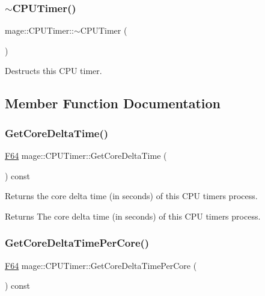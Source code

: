 \subsubsection{\texorpdfstring{$\sim$\+C\+P\+U\+Timer()}{~CPUTimer()}}
{\footnotesize\ttfamily mage\+::\+C\+P\+U\+Timer\+::$\sim$\+C\+P\+U\+Timer (\begin{DoxyParamCaption}{ }\end{DoxyParamCaption})\hspace{0.3cm}{\ttfamily [default]}}

Destructs this C\+PU timer. 

\subsection{Member Function Documentation}
\hypertarget{classmage_1_1_c_p_u_timer_a5d033c20772755d6a6693e1b495cf589}{}\label{classmage_1_1_c_p_u_timer_a5d033c20772755d6a6693e1b495cf589} 
\subsubsection{\texorpdfstring{Get\+Core\+Delta\+Time()}{GetCoreDeltaTime()}}
{\footnotesize\ttfamily \hyperlink{namespacemage_ad26233bbec640deda836e572c1a23708}{F64} mage\+::\+C\+P\+U\+Timer\+::\+Get\+Core\+Delta\+Time (\begin{DoxyParamCaption}{ }\end{DoxyParamCaption}) const\hspace{0.3cm}{\ttfamily [noexcept]}}

Returns the core delta time (in seconds) of this C\+PU timer\textquotesingle{}s process.

\begin{DoxyReturn}{Returns}
The core delta time (in seconds) of this C\+PU timer\textquotesingle{}s process. 
\end{DoxyReturn}
\hypertarget{classmage_1_1_c_p_u_timer_a2b088ff4194fd2a5fd7201e8de4dd1da}{}\label{classmage_1_1_c_p_u_timer_a2b088ff4194fd2a5fd7201e8de4dd1da} 
\subsubsection{\texorpdfstring{Get\+Core\+Delta\+Time\+Per\+Core()}{GetCoreDeltaTimePerCore()}}
{\footnotesize\ttfamily \hyperlink{namespacemage_ad26233bbec640deda836e572c1a23708}{F64} mage\+::\+C\+P\+U\+Timer\+::\+Get\+Core\+Delta\+Time\+Per\+Core (\begin{DoxyParamCaption}{ }\end{DoxyParamCaption}) const\hspace{0.3cm}{\ttfamily [noexcept]}}

